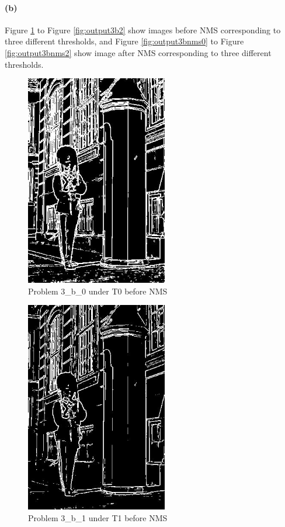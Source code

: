 \documentclass{article}
\newcommand{\spart}[1]{\paragraph{(#1)}}
\begin{document}
\spart{b} Figure \ref{fig:output3b0} to Figure \ref{fig:output3b2} show images before NMS corresponding to three different thresholds, and Figure \ref{fig:output3bnms0} to Figure \ref{fig:output3bnms2} show image after NMS corresponding to three different thresholds.
\begin{figure}[!h]
  \centering
    \includegraphics[height=25em]{code/outputs/prob3_b_0.jpg}
  \caption{Problem 3\_b\_0 under T0 before NMS}
  \label{fig:output3b0}
\end{figure}

\begin{figure}[!h]
  \centering
    \includegraphics[height=25em]{code/outputs/prob3_b_1.jpg}
  \caption{Problem 3\_b\_1 under T1 before NMS}
  \label{fig:output3b1}
\end{figure}
\end{document}
